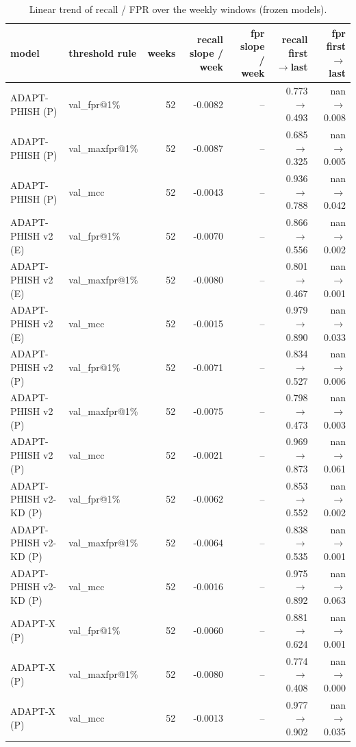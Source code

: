 \begin{table}[t]
\centering
\scriptsize
\caption{Linear trend of recall / FPR over the weekly windows (frozen models).}
\label{tab:rev_R18_forward_in_time_trend}
\begin{tabular}{llrrrrr}
\toprule
model & threshold rule & weeks & recall slope / week & fpr slope / week & recall first$\rightarrow$last & fpr first$\rightarrow$last \\
\midrule
ADAPT-PHISH (P) & val\_fpr@1\% & 52 & -0.0082 & -- & 0.773$\rightarrow$0.493 & nan$\rightarrow$0.008 \\
ADAPT-PHISH (P) & val\_maxfpr@1\% & 52 & -0.0087 & -- & 0.685$\rightarrow$0.325 & nan$\rightarrow$0.005 \\
ADAPT-PHISH (P) & val\_mcc & 52 & -0.0043 & -- & 0.936$\rightarrow$0.788 & nan$\rightarrow$0.042 \\
ADAPT-PHISH v2 (E) & val\_fpr@1\% & 52 & -0.0070 & -- & 0.866$\rightarrow$0.556 & nan$\rightarrow$0.002 \\
ADAPT-PHISH v2 (E) & val\_maxfpr@1\% & 52 & -0.0080 & -- & 0.801$\rightarrow$0.467 & nan$\rightarrow$0.001 \\
ADAPT-PHISH v2 (E) & val\_mcc & 52 & -0.0015 & -- & 0.979$\rightarrow$0.890 & nan$\rightarrow$0.033 \\
ADAPT-PHISH v2 (P) & val\_fpr@1\% & 52 & -0.0071 & -- & 0.834$\rightarrow$0.527 & nan$\rightarrow$0.006 \\
ADAPT-PHISH v2 (P) & val\_maxfpr@1\% & 52 & -0.0075 & -- & 0.798$\rightarrow$0.473 & nan$\rightarrow$0.003 \\
ADAPT-PHISH v2 (P) & val\_mcc & 52 & -0.0021 & -- & 0.969$\rightarrow$0.873 & nan$\rightarrow$0.061 \\
ADAPT-PHISH v2-KD (P) & val\_fpr@1\% & 52 & -0.0062 & -- & 0.853$\rightarrow$0.552 & nan$\rightarrow$0.002 \\
ADAPT-PHISH v2-KD (P) & val\_maxfpr@1\% & 52 & -0.0064 & -- & 0.838$\rightarrow$0.535 & nan$\rightarrow$0.001 \\
ADAPT-PHISH v2-KD (P) & val\_mcc & 52 & -0.0016 & -- & 0.975$\rightarrow$0.892 & nan$\rightarrow$0.063 \\
ADAPT-X (P) & val\_fpr@1\% & 52 & -0.0060 & -- & 0.881$\rightarrow$0.624 & nan$\rightarrow$0.001 \\
ADAPT-X (P) & val\_maxfpr@1\% & 52 & -0.0080 & -- & 0.774$\rightarrow$0.408 & nan$\rightarrow$0.000 \\
ADAPT-X (P) & val\_mcc & 52 & -0.0013 & -- & 0.977$\rightarrow$0.902 & nan$\rightarrow$0.035 \\

\end{tabular}
\end{table}
